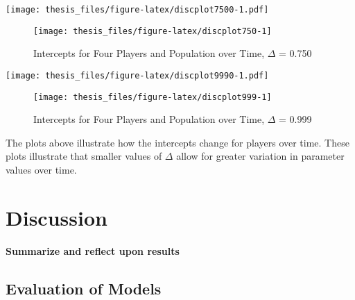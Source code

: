 \documentclass[12pt,twoside]{dukestatscithesis}
\theoremstyle{definition}
\theoremstyle{definition}
\theoremstyle{definition}
\theoremstyle{remark}
\begin{document}
\texttt{[image: thesis\_files/figure-latex/discplot7500-1.pdf]}
\begin{figure}

\hfill{}\texttt{[image: thesis\_files/figure-latex/discplot750-1]} 

\caption{Intercepts for Four Players and Population over Time, $\Delta$ = 0.750}\label{fig:discplot750}
\end{figure}
\texttt{[image: thesis\_files/figure-latex/discplot9990-1.pdf]}
\begin{figure}

\hfill{}\texttt{[image: thesis\_files/figure-latex/discplot999-1]} 

\caption{Intercepts for Four Players and Population over Time, $\Delta$ = 0.999}\label{fig:discplot999}
\end{figure}
The plots above illustrate how the intercepts change for players over
time. These plots illustrate that smaller values of \(\Delta\) allow for
greater variation in parameter values over time.

\chapter{Discussion}\label{disc}

\textbf{Summarize and reflect upon results}

\section{Evaluation of Models}\label{evaluation-of-models}
\end{document}
